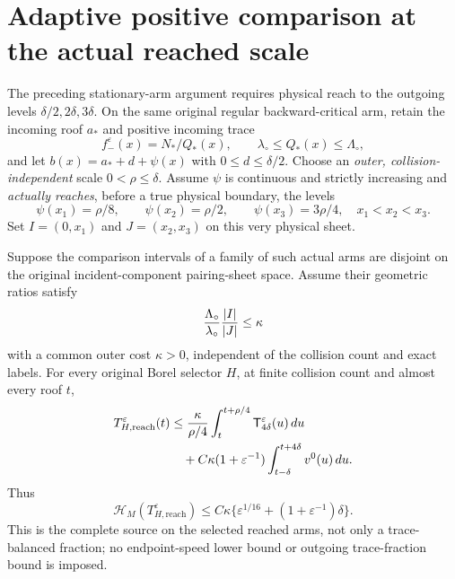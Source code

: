 \section{Adaptive positive comparison at the actual reached scale}
\label{sec:v105-adaptive}
The preceding stationary-arm argument requires physical reach to the
outgoing levels $\delta/2,2\delta,3\delta$. On the same original
regular backward-critical arm, retain the incoming roof $a_*$ and
positive incoming trace
\[
f_-^\varepsilon(x)=N_*/Q_*(x),\qquad
\lambda_\circ\le Q_*(x)\le\Lambda_\circ ,
\]
and let $b(x)=a_*+d+\psi(x)$ with $0\le d\le\delta/2$.
Choose an \emph{outer, collision-independent} scale
$0<\rho\le\delta$. Assume $\psi$ is continuous and strictly
increasing and \emph{actually reaches}, before a true physical
boundary, the levels
\begin{equation}\label{eq:v105-levels}
\psi(x_1)=\rho/8,\qquad
\psi(x_2)=\rho/2,\qquad
\psi(x_3)=3\rho/4,\quad x_1<x_2<x_3.
\end{equation}
Set $I=(0,x_1)$ and $J=(x_2,x_3)$ on this very physical sheet.
\begin{theorem}
\label{thm:v105-reach}
Suppose the comparison intervals of a family of such actual arms are
disjoint on the original incident-component pairing-sheet space.
Assume their geometric ratios satisfy
\[
 {\Lambda_\circ\over\lambda_\circ}
 {|I|\over|J|}\le\kappa
\]
with a common outer cost $\kappa>0$, independent of the collision
count and exact labels. For every original Borel selector $H$,
at finite collision count and almost every roof $t$,
\begin{align}
T_{H,\mathrm{reach}}^\varepsilon(t)
&\le {\kappa\over \rho/4}
       \int_t^{t+\rho/4}\mathsf T_{4\delta}^\varepsilon(u)\,du
\notag\\
&\quad+C\kappa(1+\varepsilon^{-1})
       \int_{t-\delta}^{t+4\delta}v^0(u)\,du .
\label{eq:v105-reach}
\end{align}
Thus
\begin{equation}\label{eq:v105-reach-height}
\mathcal H_M(T_{H,\mathrm{reach}}^\varepsilon)
\le C\kappa\{\varepsilon^{1/16}
                   +(1+\varepsilon^{-1})\delta\}.
\end{equation}
This is the complete source on the selected reached arms,
not only a trace-balanced fraction; no endpoint-speed lower bound
or outgoing trace-fraction bound is imposed.
\end{theorem}
